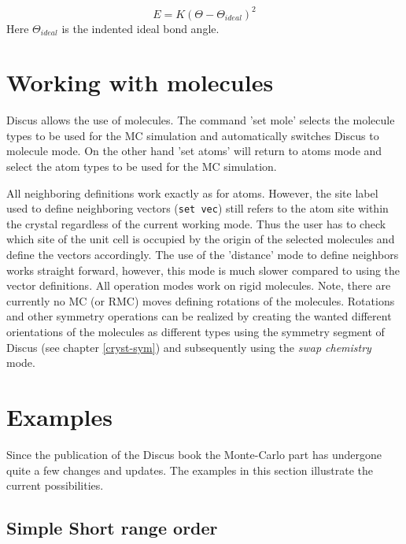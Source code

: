 \begin{equation}
  E = K \left (\Theta - \Theta_{ideal} \right )^2
\end{equation}
Here $\Theta_{ideal}$ is the indented ideal bond angle.


\section{Working with molecules \label{mc-mol}}

Discus allows the use of molecules. The command 'set mole'
selects the molecule types to be used for the MC simulation and
automatically switches Discus to molecule mode. On the other
hand 'set atoms' will return to atoms mode and select the atom
types to be used for the MC simulation. \par

All neighboring definitions work exactly as for atoms. However, the
site label used to define neighboring vectors ({\tt set vec}) still
refers to the atom site within the crystal regardless of the current
working mode.  Thus the user has to check which site of the unit
cell is occupied by the origin of the selected molecules and define
the vectors accordingly.  The use of the 'distance' mode to define
neighbors works straight forward, however, this mode is much slower
compared to using the vector definitions. All operation modes work
on rigid molecules.  Note, there are currently no MC (or RMC) moves
defining rotations of the molecules.  Rotations and other symmetry
operations can be realized by creating the wanted different
orientations of the molecules as different types using the symmetry
segment of Discus (see chapter \ref{cryst-sym}) and
subsequently using the {\it swap chemistry} mode.

\section{Examples \label{mc-exa}}

Since the publication of the Discus book \cite{nedpro} the Monte-Carlo part
has undergone quite a few changes and updates. The examples in this section
illustrate the current possibilities.

\subsection{Simple Short range order}


